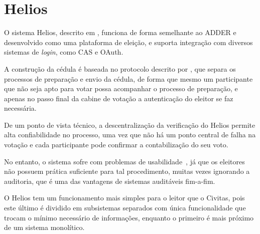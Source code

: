 \section{Helios}

O sistema Helios, descrito em \textcite{adida2008helios}, funciona de forma semelhante ao ADDER e desenvolvido como uma plataforma de eleição, e suporta integração com diversos sistemas de \textit{login}, como CAS e OAuth.

A construção da cédula é baseada no protocolo descrito por \textcite{benaloh2006simple}, que separa os processos de preparação e envio da cédula, de forma que mesmo um participante que não seja apto para votar possa acompanhar o processo de preparação, e apenas no passo final da cabine de votação a autenticação do eleitor se faz necessária.

De um ponto de vista técnico, a descentralização da verificação do Helios permite alta confiabilidade no processo, uma vez que não há um ponto central de falha na votação e cada participante pode confirmar a contabilização do seu voto.

No entanto, o sistema sofre com problemas de usabilidade~\cite{karayumak2011usability}, já que os eleitores não possuem prática suficiente para tal procedimento, muitas vezes ignorando a auditoria, que é uma das vantagens de sistemas auditáveis fim-a-fim.

O Helios tem um funcionamento mais simples para o leitor que o Civitas, pois este último é dividido em subsistemas separados com única funcionalidade que trocam o mínimo necessário de informações, enquanto o primeiro é mais próximo de um sistema monolítico.